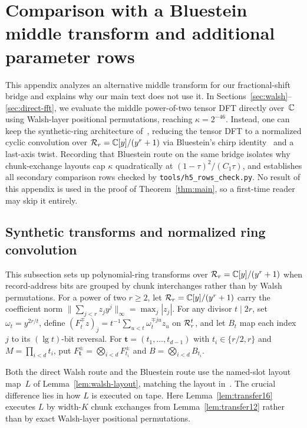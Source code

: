 \section{Comparison with a Bluestein middle transform and additional parameter rows}\label{app:bluestein}

This appendix analyzes an alternative middle transform for our fractional-shift bridge and explains why our main text does not use it. In Sections~\ref{sec:walsh}--\ref{sec:direct-fft}, we evaluate the middle power-of-two tensor DFT directly over~$\mathbb{C}$ using Walsh-layer positional permutations, reaching $\kappa=2^{-46}$. Instead, one can keep the synthetic-ring architecture of~\cite[\S\S6--7]{OAI26}, reducing the tensor DFT to a normalized cyclic convolution over $\mathcal{R}_r=\mathbb{C}[y]/(y^r+1)$ via Bluestein's chirp identity~\cite{Bluestein70} and a last-axis twist. Recording that Bluestein route on the same bridge isolates why chunk-exchange layouts cap $\kappa$ quadratically at $(1-\tau)^2/(C_1\tau)$, and establishes all secondary comparison rows checked by \texttt{tools/h5\_rows\_check.py}. No result of this appendix is used in the proof of Theorem~\ref{thm:main}, so a first-time reader may skip it entirely.

\subsection{Synthetic transforms and normalized ring convolution}\label{sec:transfer-transform}

This subsection sets up polynomial-ring transforms over $\mathcal{R}_r=\mathbb{C}[y]/(y^r+1)$ when record-address bits are grouped by chunk interchanges rather than by Walsh permutations. For a power of two $r\ge2$, let $\mathcal{R}_r=\mathbb{C}[y]/(y^r+1)$ carry the coefficient norm $\|\sum_{j<r}z_jy^j\|_\infty=\max_j|z_j|$. For any divisor $t\mid2r$, set $\omega_t=y^{2r/t}$, define $(F_t^\mp z)_j=t^{-1}\sum_{u<t}\omega_t^{\mp ju}z_u$ on $\mathcal{R}_r^t$, and let $B_t$ map each index~$j$ to its $(\lg t)$-bit reversal. For $\mathbf t=(t_1,\dots,t_{d-1})$ with $t_i\in\{r/2,r\}$ and $M=\prod_{i<d}t_i$, put $F_{\mathbf t}^\pm=\bigotimes_{i<d}F_{t_i}^\pm$ and $B=\bigotimes_{i<d}B_{t_i}$.

Both the direct Walsh route and the Bluestein route use the named-slot layout map~$L$ of Lemma~\ref{lem:walsh-layout}, matching the layout in~\cite[proof of Lemma~16, pp.~41--42]{OAI26}. The crucial difference lies in how $L$ is executed on tape. Here Lemma~\ref{lem:transfer16} executes $L$ by width-$K$ chunk exchanges from Lemma~\ref{lem:transfer12} rather than by exact Walsh-layer positional permutations.


